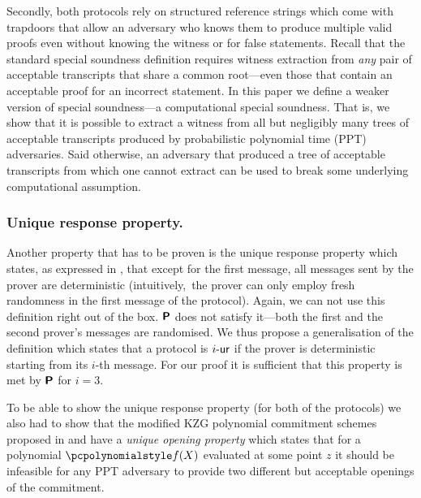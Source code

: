 \documentclass[runningheads,11pt]{llncs}
\theoremstyle{definition} \newtheorem{definition}[theorem]{Definition}
\begin{document}
Secondly, both protocols rely on structured reference strings which come with
trapdoors that allow an adversary who knows them to produce multiple valid
proofs even without knowing the witness or for false statements. Recall that the
standard special soundness definition requires witness extraction from
\emph{any} pair of acceptable transcripts that share a common root---even those
that contain an acceptable proof for an incorrect statement. In this paper we
define a weaker version of special soundness---a computational special
soundness. That is, we show that it is possible to extract a witness from
all but negligibly many trees of acceptable transcripts produced by probabilistic polynomial time (PPT) adversaries. Said otherwise, an adversary that produced
a tree of acceptable transcripts from which one cannot extract can be used to break some underlying computational assumption.

\subsubsection{Unique response property.} Another property that has to be proven
is the unique response property which states, as expressed in
\cite{C:Fischlin05}, that except for the first message, all messages sent by the
prover are deterministic (intuitively,~the prover can only employ fresh randomness
in the first message of the protocol). Again, we can not use this
definition right out of the box. $\bm{\mathsf{P}}$ does not satisfy
it---both the first and the second prover's messages are randomised. We thus propose
a generalisation of the definition which states that a protocol is ${i\text{-}\mathsf{ur}}$ if
the prover is deterministic starting from its $i$-th message. For our proof it is sufficient that this property is met by $\bm{\mathsf{P}}$ for $i = 3$.

To be able to show the unique response property (for both of the protocols) we
also had to show that the modified KZG polynomial commitment schemes
\cite{AC:KatZavGol10} proposed in \cite{EPRINT:GabWilCio19} and
\cite{CCS:MBKM19} have a \emph{unique opening property} which states that for a
polynomial $\p{f}(X)$ evaluated at some point $z$ it should be infeasible for
any PPT adversary to provide two different but acceptable openings
of the commitment.
\end{document}
